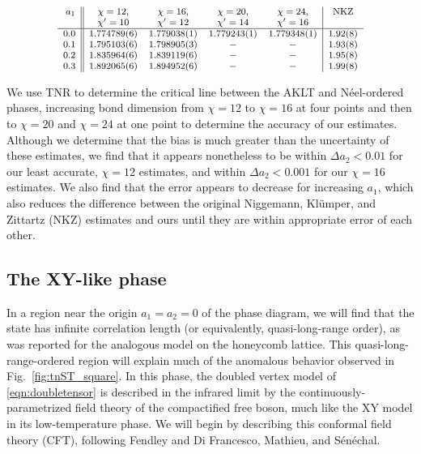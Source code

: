 \documentclass[aps,prb,letterpaper,superscriptaddress,twocolumn,showpacs,floatfix,10pt]{revtex4-1}
\begin{document}
\begin{table}
\[
\footnotesize
\begin{array}{r ||  c c c c | c }
  a_1 & \chi=12, & \chi=16, & \chi=20, & \chi=24, & \text{NKZ}\\
  & \chi'=10 & \chi'=12 & \chi'=14 & \chi'=16\\
  \hline
  0.0 & 1.774789(6) & 1.779038(1) & 1.779243(1) & 1.779348(1) & 1.92(8)\\
  0.1 & 1.795103(6) & 1.798905(3) & - & - & 1.93(8)\\
  0.2 & 1.835964(6) & 1.839119(6) & - & - & 1.95(8)\\
  0.3 & 1.892065(6) & 1.894952(6) & - & - & 1.99(8)
\end{array}
\]
\caption{We use TNR to determine the critical line between the AKLT and
N\'eel-ordered phases, increasing bond dimension from $\chi=12$ to $\chi=16$
at four points and then to $\chi=20$ and $\chi=24$ at one point
to determine the accuracy
of our estimates. Although we determine that the bias is much greater than
the uncertainty of these estimates, we find that it appears nonetheless to
be within $\Delta a_2 < 0.01$ for our least accurate, $\chi=12$ estimates,
and within $\Delta a_2 < 0.001$ for our $\chi=16$ estimates. We also find that
the error appears to decrease for increasing $a_1$, which also reduces
the difference between the original Niggemann, Kl\"umper, and Zittartz (NKZ)
estimates and ours until they are
within appropriate error of each other.}
\label{tab:VBSNeel}
\end{table}

\subsection{The XY-like phase}
\label{sec:XY-properties}
In a region near the origin $a_1=a_2=0$ of the phase diagram,
we will find that the state has infinite correlation length (or equivalently,
quasi-long-range order), as was reported for the analogous model on the
honeycomb lattice.\cite{AKLTspin32} This quasi-long-range-ordered region
will explain much of the anomalous behavior observed in
Fig.~\ref{fig:tnST_square}. In this phase, the doubled vertex model of
\eqref{eqn:doubletensor} is described in the infrared limit by the
continuously-parametrized field theory of the compactified free boson, much like
the XY model in its low-temperature phase. We will begin by describing this
 conformal field theory (CFT), following Fendley \cite{Fendley}
and Di Francesco, Mathieu, and S\'en\'echal\cite{DiFrancesco}.
\end{document}
